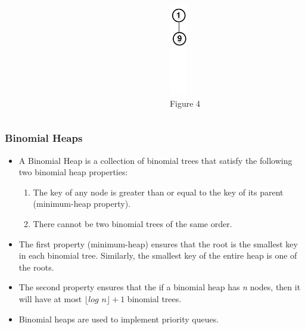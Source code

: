 \documentclass[13pt]{beamer}
\begin{document}
\begin{frame}
\begin{columns}[T]
\begin{column}[T]{3.3cm}
\begin{figure}
      \end{figure}
      \centering
    \end{column}
    \begin{column}[T]{3.3cm} %
      \begin{figure}
        \caption{Figure 4}
        \includegraphics[height=4cm]{order1.png}
      \end{figure}
    \end{column}
  \end{columns}

\end{frame}

\begin{frame}
\frametitle{Binomial Heaps}
  \begin{itemize}
    \item A \alert{Binomial Heap} is a collection of binomial trees that satisfy the following two binomial heap properties:
      \begin{enumerate}
        \item The key of any node is greater than or equal to the key of its parent (minimum-heap property).
        \item There cannot be two binomial trees of the same order.
      \end{enumerate}
    \item The first property (minimum-heap) ensures that the root is the smallest key in each binomial tree. Similarly, the smallest key of the entire heap is one of the roots.
    \item The second property ensures that the if a binomial heap has \textit{n} nodes, then it will have at most $\lfloor \textit{log n} \rfloor + 1$ binomial trees.
    \item Binomial heaps are used to implement priority queues.
  \end{itemize}
\end{frame}
\end{document}
